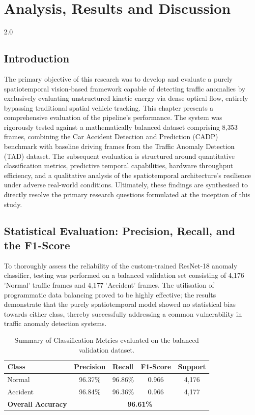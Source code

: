 \chapter{Analysis, Results and Discussion}
\label{ch:results}

\begin{spacing}{2.0}

\section{Introduction}
The primary objective of this research was to develop and evaluate a purely spatiotemporal vision-based framework capable of detecting traffic anomalies by exclusively evaluating unstructured kinetic energy via dense optical flow, entirely bypassing traditional spatial vehicle tracking. This chapter presents a comprehensive evaluation of the pipeline's performance. The system was rigorously tested against a mathematically balanced dataset comprising 8,353 frames, combining the Car Accident Detection and Prediction (CADP) benchmark with baseline driving frames from the Traffic Anomaly Detection (TAD) dataset. The subsequent evaluation is structured around quantitative classification metrics, predictive temporal capabilities, hardware throughput efficiency, and a qualitative analysis of the spatiotemporal architecture's resilience under adverse real-world conditions. Ultimately, these findings are synthesised to directly resolve the primary research questions formulated at the inception of this study.

\section{Statistical Evaluation: Precision, Recall, and the F1-Score}
To thoroughly assess the reliability of the custom-trained ResNet-18 anomaly classifier, testing was performed on a balanced validation set consisting of 4,176 'Normal' traffic frames and 4,177 'Accident' frames. The utilisation of programmatic data balancing proved to be highly effective; the results demonstrate that the purely spatiotemporal model showed no statistical bias towards either class, thereby successfully addressing a common vulnerability in traffic anomaly detection systems.

\begin{table}[H]
    \centering
    \begin{tabular}{l c c c c}
        \toprule
        \textbf{Class} & \textbf{Precision} & \textbf{Recall} & \textbf{F1-Score} & \textbf{Support} \\
        \midrule
        Normal & 96.37\% & 96.86\% & 0.966 & 4,176 \\
        Accident & 96.84\% & 96.36\% & 0.966 & 4,177 \\
        \midrule
        \textbf{Overall Accuracy} & \multicolumn{4}{c}{\textbf{96.61\%}} \\
        \bottomrule
    \end{tabular}
    \caption{Summary of Classification Metrics evaluated on the balanced validation dataset.}
    \label{tab:summary_metrics}
\end{table}


\end{spacing}
